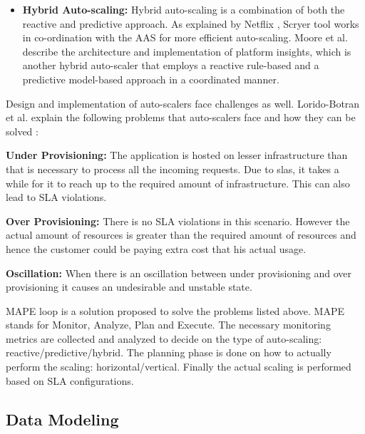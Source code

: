 \documentclass[article,type=msc,colorback,12pt,accentcolor=tud8b,table]{tudthesis}
\begin{document}
\begin{itemize}
\item{\textbf{Hybrid Auto-scaling: }} Hybrid auto-scaling is a combination of both the reactive and predictive approach. As explained by Netflix \cite{Scryer1}, Scryer tool works in co-ordination with the AAS for more efficient auto-scaling. Moore et al.\cite{moore2013coordinated} describe the architecture and implementation of platform insights, which is another hybrid auto-scaler that employs a reactive rule-based and a predictive model-based approach in a coordinated manner.
\end{itemize}
Design and implementation of auto-scalers face challenges as well. Lorido-Botran et al. explain the following problems that auto-scalers face and how they can be solved \cite{lorido2014review}:
\begin{description}
	\item{\textbf{Under Provisioning:}} The application is hosted on lesser infrastructure than that is necessary to process all the incoming requests. Due to \gls{sla}s, it takes a while for it to reach up to the required amount of infrastructure. This can also lead to SLA violations.
	
	\item{\textbf{Over Provisioning:}} There is no SLA violations in this scenario. However the actual amount of resources is greater than the required amount of resources and hence the customer could be paying extra cost that his actual usage.
	
	\item{\textbf{Oscillation:}}
		When there is an oscillation between under provisioning and over provisioning it causes an undesirable and unstable state. 
\end{description}

MAPE loop is a solution proposed to solve the problems listed above\cite{lorido2014review}. MAPE stands for Monitor, Analyze, Plan and Execute. The necessary monitoring metrics are collected and analyzed to decide on the type of auto-scaling: reactive/predictive/hybrid. The planning phase is done on how to actually perform the scaling: horizontal/vertical. Finally the actual scaling is performed based on SLA configurations.

	\subsection{Data Modeling}
	
\end{document}
